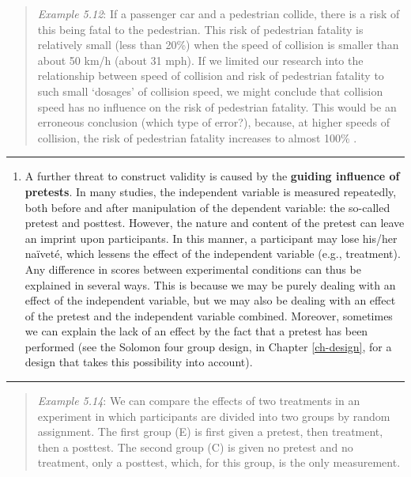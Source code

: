 \documentclass[
]{book}
\providecommand{\tightlist}{%
  \setlength{\itemsep}{0pt}\setlength{\parskip}{0pt}}
\begin{document}
\begin{quote}
\emph{Example 5.12}: If a passenger car and a pedestrian collide, there is a risk of this being fatal to the pedestrian. This risk of pedestrian fatality is relatively small (less than 20\%) when the speed of collision is smaller than about 50 km/h (about 31 mph). If we limited our research into the relationship between speed of collision and risk of pedestrian fatality to such small `dosages' of collision speed, we might conclude that collision speed has no influence on the risk of pedestrian fatality. This would be an erroneous conclusion (which type of error?), because, at higher speeds of collision, the risk of pedestrian fatality increases to almost 100\% \citep{Rosen11, SWOV12}.
\end{quote}

\begin{center}\rule{0.5\linewidth}{0.5pt}\end{center}

\begin{enumerate}
\def\labelenumi{\arabic{enumi}.}
\setcounter{enumi}{4}
\tightlist
\item
  A further threat to construct validity is caused by the \textbf{guiding influence of pretests}. In many studies, the independent variable is measured repeatedly, both before and after manipulation of the dependent variable: the so-called pretest and posttest. However, the nature and content of the pretest can leave an imprint upon participants. In this manner, a participant may lose his/her naïveté, which lessens the effect of the independent variable (e.g., treatment). Any difference in scores between experimental conditions can thus be explained in several ways. This is because we may be purely dealing with an effect of the independent variable, but we may also be dealing with an effect of the pretest and the independent variable combined. Moreover, sometimes we can explain the lack of an effect by the fact that a pretest has been performed
  (see the Solomon four group design, in Chapter \ref{ch-design},
  for a design that takes this possibility into account).
\end{enumerate}

\begin{center}\rule{0.5\linewidth}{0.5pt}\end{center}

\begin{quote}
\emph{Example 5.14}: We can compare the effects of two treatments in an experiment in which participants are divided into two groups by random assignment. The first group (E) is first given a pretest, then treatment, then a posttest. The second group (C) is given no pretest and no treatment, only a posttest, which, for this group, is the only measurement.
\end{quote}
\end{document}
